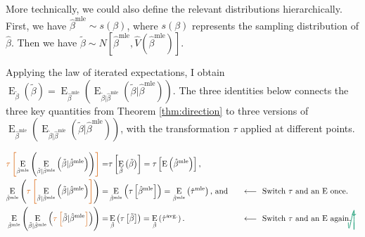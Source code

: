 \documentclass[10pt]{article}
\DeclareMathOperator*{\E}{\text{E}}
\newcommand{\tikzmark}[1]{\tikz[overlay,remember picture] \node (#1) {};}
\newcommand{\DrawBox}[2]{%
  \begin{tikzpicture}[overlay,remember picture]
    \draw[->,shorten >= 6pt, shorten <= 2pt, out=-90, in=90, distance=1.2cm, color2, thick] (MarkA.east) to (MarkB.east);
    \draw[->,shorten >= 6pt, shorten <= 2pt, out=-90, in=90, distance=1cm, color2, thick] (MarkC.west) to (MarkD.east);
  \end{tikzpicture}
}
\newcommand{\justif}[2]{&{#1}&\text{#2}}
\begin{document}
More technically, we could also define the relevant distributions hierarchically. 
First, we have $\hat{\beta}^\text{mle} \sim s(\beta)$, where $s(\beta)$ represents the sampling distribution of $\hat{\beta}$. 
Then we have $\tilde{\beta} \sim N \left[ \hat{\beta}^{\text{mle}}, \hat{V} \left( \hat{\beta}^{\text{mle}} \right) \right]$. 

Applying the law of iterated expectations, I obtain $\E_{\tilde{\beta}} \left( \tilde{\beta} \right) = \E_{\hat{\beta}^\text{mle}}\left( \E_{\tilde{\beta} | \hat{\beta}^\text{mle}} (\tilde{\beta} | \hat{\beta}^\text{mle}) \right)$.
The three identities below connects the three key quantities from Theorem \ref{thm:direction} to three versions of $\E_{\hat{\beta}^\text{mle}}\left( \E_{\tilde{\beta} | \hat{\beta}^\text{mle}} (\tilde{\beta} | \hat{\beta}^\text{mle}) \right)$, with the transformation $\tau$ applied at different points.

\begin{alignat}{2}
 \color{color1} \tikzmark{MarkA}\tau \left[ \normalcolor \E_{\hat{\beta}^\text{mle}}\left( \E_{\tilde{\beta} | \hat{\beta}^\text{mle}} \left( \tilde{\beta} | \hat{\beta}^\text{mle} \right) \right) \color{color1} \right] \normalcolor =&  \tau \left[ \E_{\tilde{\beta}} \left( \tilde{\beta} \right) \right] = \tau \left[\E \left( \hat{\beta}^\text{mle} \right) \right]\text{,} \label{eqn:true}\\
 \E_{\hat{\beta}^\text{mle}}\left( \color{color1} \tikzmark{MarkB}\tau\tikzmark{MarkC} \left[ \normalcolor \E_{\tilde{\beta} | \hat{\beta}^\text{mle}} \left( \tilde{\beta} | \hat{\beta}^\text{mle} \right) \color{color1} \right] \normalcolor \right)  =&  \E_{\hat{\beta}^\text{mle}} \left( \tau \left[\hat{\beta}^\text{mle} \right] \right) =  \E_{\hat{\beta}^\text{mle}} \left(\hat{\tau}^\text{mle} \right) \text{, and} \justif{\quad}{$\longleftarrow~$ Switch $\tau$ and an $\E$ once.} \label{eqn:mle}\\
\E_{\hat{\beta}^\text{mle}}\left( \E_{\tilde{\beta} | \hat{\beta}^\text{mle}} \left( \color{color1} \tikzmark{MarkD}\tau \left[ \normalcolor \tilde{\beta} | \hat{\beta}^\text{mle} \color{color1} \right] \normalcolor \right) \right)  =& 
\E_{\tilde{\beta}} \left( \tau \left[\tilde{\beta} \right] \right)  = 
\E_{\tilde{\beta}} \left(\hat{\tau}^\text{avg.} \right) \text{.}\justif{\quad}{$\longleftarrow~$ Switch $\tau$ and an $\E$ again.}\label{eqn:avg}\DrawBox{red}{blue}
\end{alignat}
\end{document}
